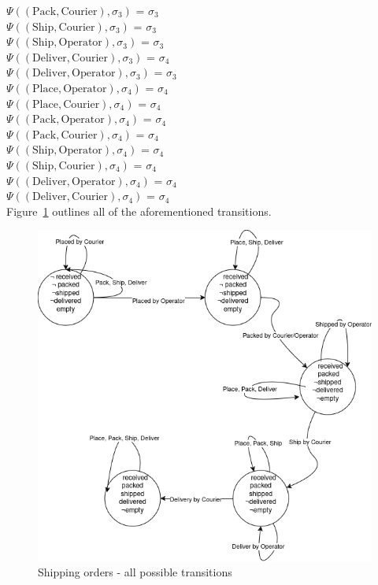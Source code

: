 \documentclass[a4paper]{article}
\begin{document}
$\Psi((\text{Pack},\text{Courier}),\sigma_3)$ = $\sigma_3$ \\[0.1\baselineskip] 
$\Psi((\text{Ship},\text{Courier}),\sigma_3)$ = $\sigma_3$ \\[0.1\baselineskip] 
$\Psi((\text{Ship},\text{Operator}),\sigma_3)$ = $\sigma_3$ \\[0.1\baselineskip] 
$\Psi((\text{Deliver},\text{Courier}),\sigma_3)$ = $\sigma_4$ \\[0.1\baselineskip] 
$\Psi((\text{Deliver},\text{Operator}),\sigma_3)$ = $\sigma_3$ \\[0.7\baselineskip] 
$\Psi((\text{Place},\text{Operator}),\sigma_4)$ = $\sigma_4$ \\[0.1\baselineskip] 
$\Psi((\text{Place},\text{Courier}),\sigma_4)$ = $\sigma_4$ \\[0.1\baselineskip] 
$\Psi((\text{Pack},\text{Operator}),\sigma_4)$ = $\sigma_4$ \\[0.1\baselineskip] 
$\Psi((\text{Pack},\text{Courier}),\sigma_4)$ = $\sigma_4$ \\[0.1\baselineskip] 
$\Psi((\text{Ship},\text{Operator}),\sigma_4)$ = $\sigma_4$ \\[0.1\baselineskip] 
$\Psi((\text{Ship},\text{Courier}),\sigma_4)$ = $\sigma_4$ \\[0.1\baselineskip] 
$\Psi((\text{Deliver},\text{Operator}),\sigma_4)$ = $\sigma_4$ \\[0.1\baselineskip] 
$\Psi((\text{Deliver},\text{Courier}),\sigma_4)$ = $\sigma_4$ \\[0.7\baselineskip] 
Figure~\ref{fig:shipping_transitions} outlines all of the aforementioned transitions.
\begin{figure}[H]
    \centering
    \includegraphics[width=0.75\linewidth]{ShiporderAutomata.drawio.png}
    \caption{Shipping orders - all possible transitions}
    \label{fig:shipping_transitions}
\end{figure}
\end{document}
